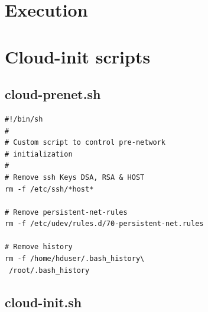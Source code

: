 \documentclass{sig-alternate}
\begin{document}
\section{Execution}




\appendix

\section{Cloud-init scripts}\label{sec:apx}
\subsection{cloud-prenet.sh}

\begin{verbatim}
#!/bin/sh
#
# Custom script to control pre-network
# initialization
#
# Remove ssh Keys DSA, RSA & HOST
rm -f /etc/ssh/*host*

# Remove persistent-net-rules
rm -f /etc/udev/rules.d/70-persistent-net.rules

# Remove history
rm -f /home/hduser/.bash_history\
 /root/.bash_history
\end{verbatim}


\subsection{cloud-init.sh}
\end{document}
